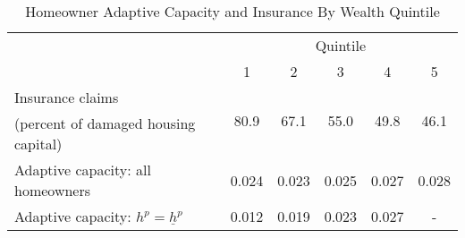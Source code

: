 \begin{table}[H] 
\singlespace 
\center 
\caption{Homeowner Adaptive Capacity and Insurance By Wealth Quintile} \label{tab:quintiles}
\vspace{-.1in} 
\begin{tabular}{l c c c c c}\hline 
\hline 
 & \multicolumn{5}{c}{Quintile}\\  \cline{2-6} 	&  1 & 2 &  3&  4 &  5 \\ 
\hline 
Insurance claims & \multirow{2}{*}{    80.9} & \multirow{2}{*}{    67.1} & \multirow{2}{*}{    55.0}  & \multirow{2}{*}{    49.8} & \multirow{2}{*}{    46.1} \\[-0.75ex](percent of damaged housing capital) \\Adaptive capacity: all homeowners & \multirow{1}{*}{   0.024} & \multirow{1}{*}{   0.023} & \multirow{1}{*}{   0.025} & \multirow{1}{*}{   0.027} & \multirow{1}{*}{   0.028}  \\Adaptive capacity: $h^p = \underline{h}^p$ & \multirow{1}{*}{   0.012} & \multirow{1}{*}{   0.019} & \multirow{1}{*}{   0.023} & \multirow{1}{*}{   0.027} & \multirow{1}{*}{-}  \\\hline 
\end{tabular}
\end{table} 

